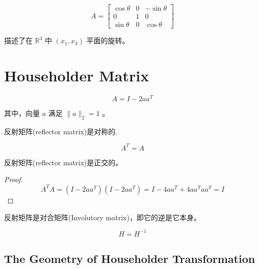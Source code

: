 \begin{example}
    $$ A=\left[\begin{array}{ccc}\cos \theta & 0 & -\sin \theta \\ 0 & 1 & 0 \\ \sin \theta & 0 & \cos \theta\end{array}\right] $$

    描述了在 $ \mathbb{R}^{3} $ 中 $ \left(x_{1}, x_{3}\right) $ 平面的旋转。
\end{example}

\section{Householder Matrix}

\begin{definition}
    $$
A=I-2 a a^{T}
$$

其中，向量 $ a $ 满足 $ \|a\|_{2}=1 $ 。
\end{definition}

\begin{theorem}
    反射矩阵(reflector matrix)是对称的.

    $$A^T=A$$
\end{theorem}

\begin{theorem}
    反射矩阵(reflector matrix)是正交的。

\end{theorem}

\begin{proof}
    $$ A^{T} A=\left(I-2 a a^{T}\right)\left(I-2 a a^{T}\right)=I-4 a a^{T}+4 a a^{T} a a^{T}=I $$
\end{proof}

\begin{theorem}
    反射矩阵是对合矩阵(Involutory matrix)，即它的逆是它本身。

    $$H =  H^{-1}$$
\end{theorem}

\subsection{The Geometry of Householder Transformation}

